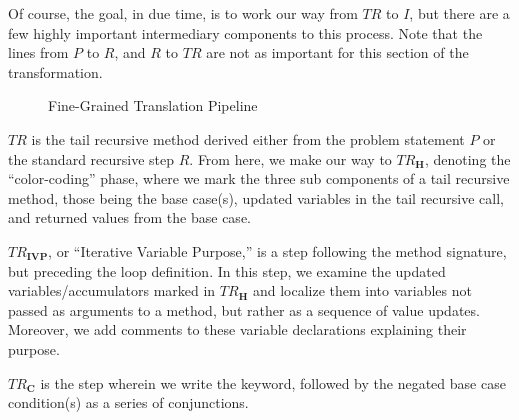 Of course, the goal, in due time, is to work our way from $TR$ to $I$, but there are a few highly important intermediary components to this process. Note that the lines from $P$ to $R$, and $R$ to $TR$ are not as important for this section of the transformation.

\begin{figure}[h!]
\centering
{}
\caption{Fine-Grained Translation Pipeline}
\end{figure}

$TR$ is the tail recursive method derived either from the problem statement $P$ or the standard recursive step $R$. From here, we make our way to \emph{$TR_\mathbf{H}$}, denoting the ``color-coding'' phase, where we mark the three sub components of a tail recursive method, those being the base case(s), updated variables in the tail recursive call, and returned values from the base case. 

\emph{$TR_\mathbf{IVP}$}, or ``Iterative Variable Purpose,'' is a step following the method signature, but preceding the loop definition. In this step, we examine the updated variables/accumulators marked in \emph{$TR_\mathbf{H}$} and localize them into variables not passed as arguments to a method, but rather as a sequence of value updates. Moreover, we add comments to these variable declarations explaining their purpose.

\emph{$TR_\mathbf{C}$} is the step wherein we write the  keyword, followed by the negated base case condition(s) as a series of conjunctions.

